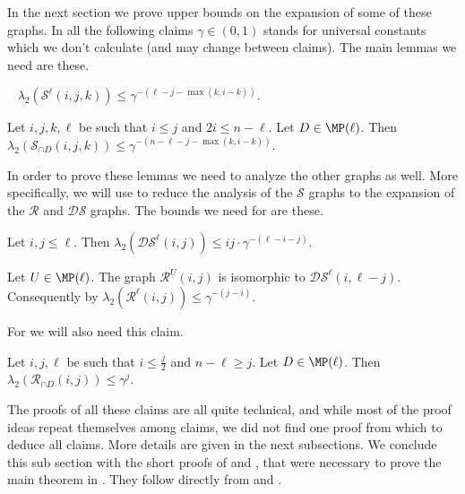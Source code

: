 In the next section we prove upper bounds on the expansion of some of these graphs. In all the following claims \(\gamma \in (0,1)\) stands for universal constants which we don't calculate (and may change between claims). The main lemmas we need are these. 
\begin{lemma} \label{lem:expansion-of-S-upper-loc}~
    \(\lambda_2(\mathcal{S}^{\ell}(i,j,k)) \leq \gamma^{-(\ell-j-\max(k,i-k))}\).
\end{lemma}

\begin{lemma} \label{lem:expansion-of-S-lower-loc}
    Let \(i,j,k,\ell\) be such that \(i \leq j\) and \(2i \leq n-\ell\). Let \(D \in \MP(\ell)\). Then \(\lambda_2(\mathcal{S}_{\cap D}(i,j,k)) \leq \gamma^{-(n-\ell-j-\max(k,i-k))}\).
\end{lemma}

In order to prove these lemmas we need to analyze the other graphs as well. More specifically, we will use  to reduce the analysis of the \(\mathcal{S}\) graphs to the expansion of the \(\mathcal{R}\) and \(\mathcal{DS}\) graphs. The bounds we need for  are these.
\begin{claim} \label{claim:upper-local-ds-bound}
    Let \(i,j \leq \ell\). Then
    \(\lambda_2(\mathcal{DS}^{\ell}(i,j)) \leq i j \cdot \gamma^{-(\ell-i-j)}\).
\end{claim}

\begin{claim} \label{claim:upper-local-R-bound}
    Let \(U \in \MP(\ell)\). The graph \(\mathcal{R}^{U}(i,j)\) is isomorphic to \(\mathcal{DS}^{\ell}(i,\ell-j)\). Consequently by 
    \(\lambda_2(\mathcal{R}^{\ell}(i,j)) \leq \gamma^{-(j-i)}\).
\end{claim}

For  we will also need this claim.
\begin{claim} \label{claim:lower-R-bound}
    Let \(i,j,\ell\) be such that \(i \leq \frac{j}{2}\) and \(n-\ell \geq j\). Let \(D \in \MP(\ell)\). Then \(\lambda_2(\mathcal{R}_{\cap D}(i,j)) \leq \gamma^{j}\).
\end{claim}

The proofs of all these claims are all quite technical, and while most of the proof ideas repeat themselves among claims, we did not find one proof from which to deduce all claims. More details are given in the next subsections. We conclude this sub section with the short proofs of  and , that were necessary to prove the main theorem in . They follow directly from  and .

